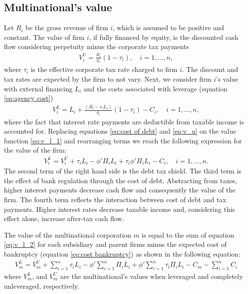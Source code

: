 \documentclass[12pt]{article}
\begin{document}
	\subsection{Multinational's value}
	\label{subsec:value}
	Let $R_i$ be the gross revenue of firm $i$, which is assumed to be positive and constant. The value of firm $i$, if fully financed by equity, is the discounted cash flow considering perpetuity minus the corporate tax payments 
	\begin{equation}
	\begin{aligned}
	V_i^U=\frac{R_i}{\delta_i}(1-\tau_{i}), \quad i=1,...,n,
	\end{aligned}
	\label{eq:v_u}
	\end{equation}	
	where $\tau_{i}$ is the effective corporate tax rate charged to firm $i$. The discount and tax rates are expected by the firm to not vary. Next, we consider firm $i$'s value with external financing $L_i$ and the costs associated with leverage (equation \ref{eq:agency cost})
	\begin{equation}
	\begin{aligned}
	V_i^L=L_i+\frac{(R_i-r_iL_i)}{\delta_i}(1-\tau_{i})-C_i, \quad i=1,...,n,
	\end{aligned}
	\label{eq:v_l_1}
	\end{equation}	
	where the fact that interest rate payments are deductible from taxable income is accounted for. Replacing equations \ref{eq:cost of debt} and \ref{eq:v_u} on the value function \ref{eq:v_l_1} and rearranging terms we reach the following expression for the value of the firm:
	\begin{equation}
	\begin{aligned}
	V_i^L=V_i^U+\tau_{i}L_i-\phi'\Pi_iL_i+\tau_{i}\phi'\Pi_iL_i-C_i, \quad i=1,...,n.
	\end{aligned}
	\label{eq:v_l_2}
	\end{equation}	
	The second term of the right hand side is the debt tax shield. The third term is the effect of bank regulation through the cost of debt. Abstracting from taxes, higher interest payments decrease cash flow and consequently the value of the firm. The fourth term reflects the interaction between cost of debt and tax payments. Higher interest rates decrease taxable income and, considering this effect alone, increase after-tax cash flow.
	
	The value of the multinational corporation $m$ is equal to the sum of equation \ref{eq:v_l_2} for each subsidiary and parent firms minus the expected cost of bankruptcy (equation \ref{eq:cost bankruptcy}) as shown in the following equation:
	\begin{equation}
	\begin{aligned}
	V_m^L=V_m^U+\sum_{i=1}^{n}\tau_iL_i-\phi'\sum_{i=1}^{n}\Pi_iL_i+\phi'\sum_{i=1}^{n}\tau_i\Pi_i L_i-C_m-\sum_{i=1}^{n}C_i
	\end{aligned}
	\label{eq:v_l}
	\end{equation}
	where $V_m^L$, and $V_m^U$ are the multinational's values when leveraged and completely unleveraged, respectively.
\end{document}
